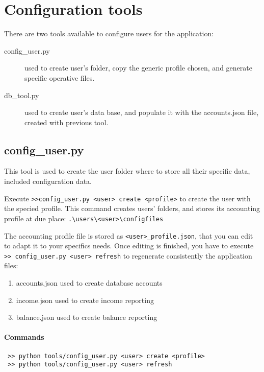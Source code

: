 \documentclass[12pt, a4paper]{article}
\begin{document}
 \section{Configuration tools}
 There are two  tools available to configure users for the application:
 \begin{description}
 \item[config\_user.py] used to create user's folder, copy the generic profile chosen, and generate specific operative files.  
 \item[db\_tool.py] used to create user's data base, and populate it with the accounts.json file, created with previous tool.
 \end{description}
 
 \subsection{config\_user.py}
 This tool is used to create the user folder where to store all their specific data, included configuration data. 
 
 Execute \verb!>>config_user.py <user> create <profile>! to create the user with the specied profile. 
 This command creates users' folders, and stores its accounting profile at due place: \verb!.\users\<user>\configfiles!
 
 The accounting profile file is stored as \verb!<user>_profile.json!, that you can edit to adapt it to your specifics needs. 
 Once editing is finished, you have to execute \verb!>> config_user.py <user> refresh! to regenerate consistently the application files:
 
 \begin {enumerate}
 \item accounts.json used to create database accounts
 \item income.json used to create income reporting
 \item balance.json used to create balance reporting
 \end{enumerate}
 
 \paragraph{Commands}
 \begin{verbatim}
 >> python tools/config_user.py <user> create <profile> 
 >> python tools/config_user.py <user> refresh
 \end{verbatim}
 
\end{document}

